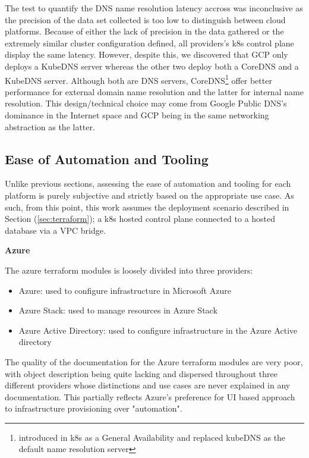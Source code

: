\documentclass[11pt]{article}
\begin{document}
The test to quantify the DNS name resolution latency accross was inconclusive as the precision of the data set collected is too low to distinguish between cloud platforms. Because of either the lack of precision in the data gathered or the extremely similar cluster configuration defined, all providers's k8s control plane display the same latency. However, despite this, we discovered that GCP only deploys a KubeDNS server whereas the other two deploy both a CoreDNS and a KubeDNS server. Although both are DNS servers, CoreDNS\footnote{introduced in k8s as a General Availability and replaced kubeDNS as the default name resolution server} offer better performance for external domain name resolution and the latter for internal name resolution. This design/technical choice may come from Google Public DNS's dominance in the Internet space and GCP being in the same networking abstraction as the latter. 

\subsection{Ease of Automation and Tooling}

\hspace{5mm} Unlike previous sections, assessing the ease of automation and tooling for each platform is purely subjective and strictly based on the appropriate use case. As such, from this point, this work assumes the deployment scenario described in Section (\ref{sec:terraform}); a k8s hosted control plane connected to a hosted database via a VPC bridge. 

\textbf{Azure}

The azure terraform modules is loosely divided into three providers:

\begin{itemize}
    \item Azure: used to configure infrastructure in Microsoft Azure
    \item Azure Stack: used to manage resources in Azure Stack
    \item Azure Active Directory: used to configure infrastructure in the Azure Active directory
\end{itemize}

The quality of the documentation for the Azure terraform modules are very poor, with object description being quite lacking and dispersed throughout three different providers whose distinctions and use cases are never explained in any documentation. This partially reflects Azure's preference for UI based approach to infrastructure provisioning over "automation".
\end{document}
